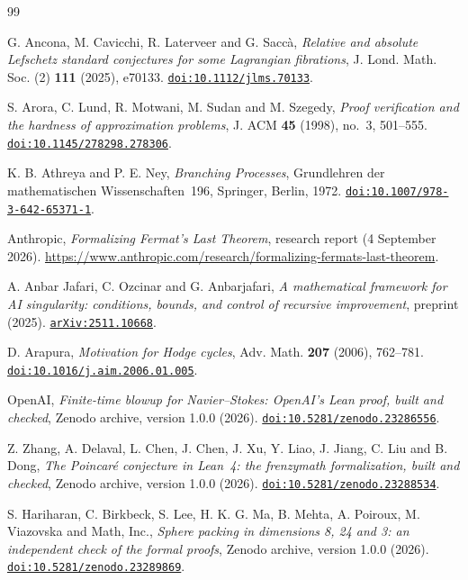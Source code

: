 \begin{thebibliography}{99}\raggedright

G. Ancona, M. Cavicchi, R. Laterveer and G. Sacc\`a,
\emph{Relative and absolute Lefschetz standard conjectures for some Lagrangian fibrations},
J. Lond. Math. Soc. (2) \textbf{111} (2025), e70133.
\href{https://doi.org/10.1112/jlms.70133}{\nolinkurl{doi:10.1112/jlms.70133}}.

S. Arora, C. Lund, R. Motwani, M. Sudan and M. Szegedy,
\emph{Proof verification and the hardness of approximation problems},
J. ACM \textbf{45} (1998), no.~3, 501--555.
\href{https://doi.org/10.1145/278298.278306}{\nolinkurl{doi:10.1145/278298.278306}}.

K. B. Athreya and P. E. Ney,
\emph{Branching Processes},
Grundlehren der mathematischen Wissenschaften~196, Springer, Berlin, 1972.
\href{https://doi.org/10.1007/978-3-642-65371-1}{\nolinkurl{doi:10.1007/978-3-642-65371-1}}.

Anthropic,
\emph{Formalizing Fermat's Last Theorem},
research report (4 September 2026).
\url{https://www.anthropic.com/research/formalizing-fermats-last-theorem}.

A. Anbar Jafari, C. Ozcinar and G. Anbarjafari,
\emph{A mathematical framework for AI singularity: conditions, bounds, and control of recursive improvement},
preprint (2025).
\href{https://arxiv.org/abs/2511.10668}{\nolinkurl{arXiv:2511.10668}}.

D. Arapura,
\emph{Motivation for Hodge cycles},
Adv. Math. \textbf{207} (2006), 762--781.
\href{https://doi.org/10.1016/j.aim.2006.01.005}{\nolinkurl{doi:10.1016/j.aim.2006.01.005}}.

OpenAI,
\emph{Finite-time blowup for Navier--Stokes: OpenAI's Lean proof, built and checked},
Zenodo archive, version 1.0.0 (2026).
\href{https://doi.org/10.5281/zenodo.23286556}{\nolinkurl{doi:10.5281/zenodo.23286556}}.

Z. Zhang, A. Delaval, L. Chen, J. Chen, J. Xu, Y. Liao, J. Jiang, C. Liu and B. Dong,
\emph{The Poincar\'e conjecture in Lean~4: the frenzymath formalization, built and checked},
Zenodo archive, version 1.0.0 (2026).
\href{https://doi.org/10.5281/zenodo.23288534}{\nolinkurl{doi:10.5281/zenodo.23288534}}.

S. Hariharan, C. Birkbeck, S. Lee, H. K. G. Ma, B. Mehta, A. Poiroux, M. Viazovska and Math, Inc.,
\emph{Sphere packing in dimensions 8, 24 and 3: an independent check of the formal proofs},
Zenodo archive, version 1.0.0 (2026).
\href{https://doi.org/10.5281/zenodo.23289869}{\nolinkurl{doi:10.5281/zenodo.23289869}}.


\end{thebibliography}
